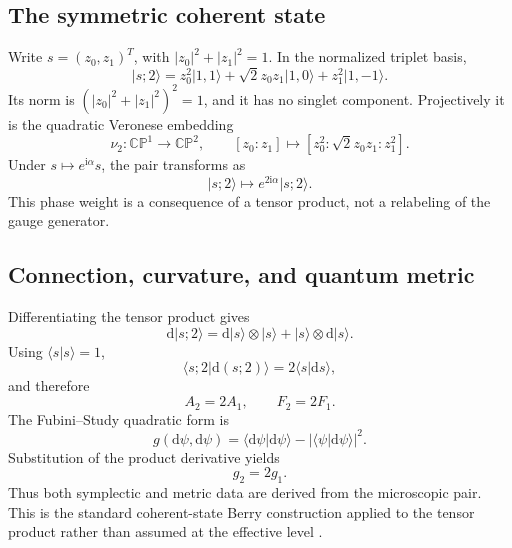 \documentclass[11pt]{article}
\theoremstyle{definition}
\theoremstyle{remark}
\newcommand{\CP}{\mathbb{CP}}
\newcommand{\ii}{\mathrm i}
\newcommand{\dd}{\mathrm d}
\newcommand{\ket}[1]{\lvert #1\rangle}
\newcommand{\braket}[2]{\langle #1\vert #2\rangle}
\begin{document}
\subsection{The symmetric coherent state}

Write \(s=(z_0,z_1)^T\), with \(|z_0|^2+|z_1|^2=1\).  In the normalized
triplet basis,
\begin{equation}
 \ket{s;2}
 =z_0^2\ket{1,1}
  +\sqrt2z_0z_1\ket{1,0}
  +z_1^2\ket{1,-1}.
 \label{eq:veronese-state}
\end{equation}
Its norm is \((|z_0|^2+|z_1|^2)^2=1\), and it has no singlet component.
Projectively it is the quadratic Veronese embedding
\begin{equation}
 \nu_2:\CP^1\longrightarrow\CP^2,\qquad
 [z_0:z_1]\longmapsto[z_0^2:\sqrt2z_0z_1:z_1^2].
 \label{eq:veronese-map}
\end{equation}
Under \(s\mapsto e^{\ii\alpha}s\), the pair transforms as
\begin{equation}
 \ket{s;2}\mapsto e^{2\ii\alpha}\ket{s;2}.
 \label{eq:phase-two}
\end{equation}
This phase weight is a consequence of a tensor product, not a relabeling of
the gauge generator.

\subsection{Connection, curvature, and quantum metric}

Differentiating the tensor product gives
\begin{equation}
 \dd\ket{s;2}
 =\dd\ket{s}\otimes\ket{s}+\ket{s}\otimes\dd\ket{s}.
\end{equation}
Using \(\braket{s}{s}=1\),
\begin{equation}
 \braket{s;2}{\dd(s;2)}=2\braket{s}{\dd s},
\end{equation}
and therefore
\begin{equation}
 \boxed{A_2=2A_1,\qquad F_2=2F_1.}
 \label{eq:berry-addition}
\end{equation}
The Fubini--Study quadratic form is
\begin{equation}
 g(\dd\psi,\dd\psi)
 =\braket{\dd\psi}{\dd\psi}
  -|\braket{\psi}{\dd\psi}|^2.
\end{equation}
Substitution of the product derivative yields
\begin{equation}
 \boxed{g_2=2g_1.}
 \label{eq:metric-addition}
\end{equation}
Thus both symplectic and metric data are derived from the microscopic pair.
This is the standard coherent-state Berry construction applied to the tensor
product rather than assumed at the effective level
\cite{Berry1984,Perelomov1972APE3}.
\end{document}
